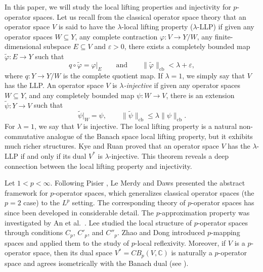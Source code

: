 \documentclass[12pt]{article}
\newcommand{\CBp}{CB_p}
\begin{document}
In this paper, we will study the local lifting properties and injectivity for $p$-operator spaces. Let us recall from the classical operator space theory \cite{KyeRuan1999} that an operator space $V$ is said to have the $\lambda$-local lifting property ($\lambda$-LLP) if given any operator spaces $W \subseteq Y$, any complete contraction $\varphi: V \to Y/W$, any finite-dimensional subspace $E \subseteq V$ and $\varepsilon>0$, there exists a completely bounded map $\tilde{\varphi}: E \to Y$ such that
\[
q\circ \tilde{\varphi}=\varphi|_E
\qquad\text{and}\qquad
\|\tilde{\varphi}\|_{\mathrm{cb}}< \lambda+\varepsilon,
\]
where $q: Y \to Y/W$ is the complete quotient map. If $\lambda = 1$, we simply say that $V$ has the LLP. An operator space $V$ is \emph{$\lambda$-injective} if given any operator spaces $W\subseteq Y$, and any completely bounded map $\psi:W\to V$, there is an extension $\widetilde{\psi}:Y\to V$ such that
\[
\widetilde{\psi}|_{W}=\psi,\qquad
\|\widetilde{\psi}\|_{\mathrm{cb}}\leq\lambda\|\psi\|_{\mathrm{cb}}.
\]
For $\lambda=1$, we say that $V$ is injective. The local lifting property is a natural non-commutative analogue of the Banach space local lifting property, but it exhibits much richer structures. Kye and Ruan \cite{KyeRuan1999} proved that an operator space $V$ has the $\lambda$-LLP if and only if its dual $V^*$ is $\lambda$-injective. This theorem reveals a deep connection between the local lifting property and injectivity.

Let $1<p<\infty$. Following Pisier \cite{Pisier1990}, Le Merdy \cite{LeMerdy1996} and Daws \cite{Daws2007} presented the abstract framework for $p$-operator spaces, which generalizes classical operator spaces (the $p=2$ case) to the $L^p$ setting. The corresponding theory of $p$-operator spaces has since been developed in considerable detail. The $p$-approximation property was investigated by An et al.\ \cite{AnLeeRuan2010}. Lee \cite{Lee2014} studied the local structure of $p$-operator spaces through conditions $C_p$, $C'_p$, and $C''_p$. Zhao and Dong \cite{ZD14} introduced $p$-mapping spaces and applied them to the study of $p$-local reflexivity. Moreover, if $V$ is a $p$-operator space, then its dual space $V^* = \CBp(V, \mathbb{C})$ is naturally a $p$-operator space and agrees isometrically with the Banach dual (see \cite{Daws2007}).
\end{document}
